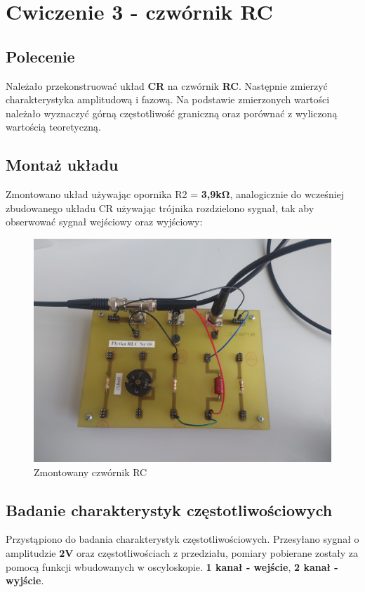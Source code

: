 \chapter{Cwiczenie 3 - czwórnik RC}

\section{Polecenie}

Należało przekonstruować układ \textbf{CR} na czwórnik \textbf{RC}. Następnie zmierzyć charakterystyka amplitudową i fazową.
Na podstawie zmierzonych wartości należało wyznaczyć górną częstotliwość graniczną oraz porównać z wyliczoną wartością teoretyczną.

\section{Montaż układu}

Zmontowano układ używając opornika R2 = \textbf{3,9k}$\boldsymbol{\Omega}$, analogicznie do wcześniej zbudowanego układu CR używając trójnika rozdzielono sygnał, tak aby obserwować sygnał wejściowy oraz wyjściowy:
    \begin{figure}[h]
        \centering
        \includegraphics[scale=0.13]{img_phone/IMG_20220330_110044_smaller.jpg}
        \caption{Zmontowany czwórnik RC}
        \label{fig:built_RC}
    \end{figure}
    
\section{Badanie charakterystyk częstotliwościowych}
    Przystąpiono do badania charakterystyk częstotliwościowych.
    Przesyłano sygnał o amplitudzie \textbf{2V} oraz częstotliwościach z przedziału, pomiary pobierane zostały za pomocą funkcji wbudowanych w oscyloskopie. \textbf{1 kanał - wejście}, \textbf{2 kanał - wyjście}.

